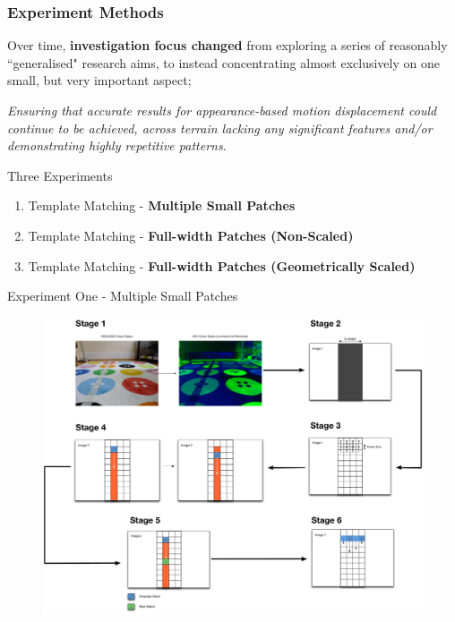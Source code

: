 \documentclass[10pt, compress]{beamer}
\begin{document}
\begin{frame}[fragile]
  \frametitle{Experiment Methods}
  
  {\normalsize Over time, \textbf{investigation focus changed} from exploring a series of reasonably ``generalised" research aims, to instead concentrating almost exclusively on one small, but very important aspect; 
  \vspace{-10pt}
  
  \begin{block}{}
  \textit{Ensuring that accurate results for appearance-based motion displacement could continue to be achieved, across terrain lacking any significant features and/or demonstrating highly repetitive patterns}.
  \end{block}}
		
  \begin{block}{Three Experiments}
  \begin{enumerate}[label={\arabic*.}]
  	  
  \item Template Matching - \textbf{Multiple Small Patches}

  \item Template Matching - \textbf{Full-width Patches (Non-Scaled)}
  
  \item Template Matching - \textbf{Full-width Patches (Geometrically Scaled)}
 
\end{enumerate}
\end{block}

\end{frame}

\begin{frame}{Experiment One - Multiple Small Patches}


\vspace{-15pt}

\begin{figure}[ht!]
\centering
\includegraphics[scale=0.17]{ex1stages}
  \end{figure}
  
  
\end{frame}
\end{document}
